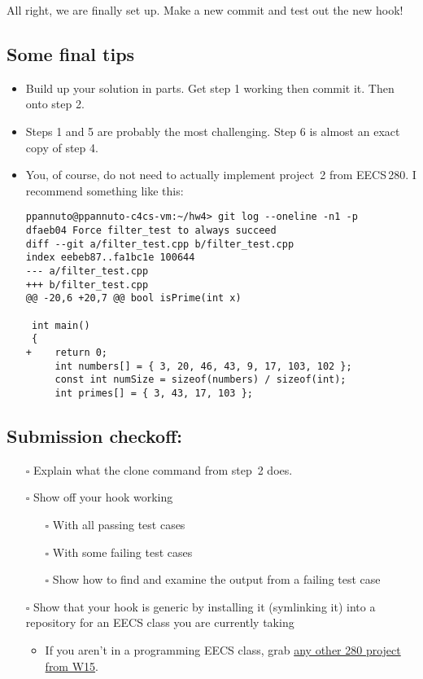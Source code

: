 \documentclass{article}
\begin{document}
\medskip
\noindent
All right, we are finally set up. Make a new commit and test out the new hook!

\newpage

\subsection*{Some final tips}

\begin{itemize}
  \item Build up your solution in parts. Get step 1 working then commit it.
    Then onto step 2.
  \item Steps 1 and 5 are probably the most challenging. Step 6 is almost an
    exact copy of step 4.
  \item You, of course, do not need to actually implement project~2 from
    EECS\,280.  I recommend something like this:%
\lstset{basicstyle=\footnotesize\ttfamily}
\begin{lstlisting}
ppannuto@ppannuto-c4cs-vm:~/hw4> git log --oneline -n1 -p
dfaeb04 Force filter_test to always succeed
diff --git a/filter_test.cpp b/filter_test.cpp
index eebeb87..fa1bc1e 100644
--- a/filter_test.cpp
+++ b/filter_test.cpp
@@ -20,6 +20,7 @@ bool isPrime(int x)
 
 int main()
 {
+    return 0;
     int numbers[] = { 3, 20, 46, 43, 9, 17, 103, 102 };
     const int numSize = sizeof(numbers) / sizeof(int);
     int primes[] = { 3, 43, 17, 103 };
\end{lstlisting}
\end{itemize}


\subsection*{Submission checkoff:}
\begin{itemize}
  \item[$\square$] Explain what the clone command from step~2 does.
  \item[$\square$] Show off your hook working
    \begin{itemize}
      \item[$\square$] With all passing test cases
      \item[$\square$] With some failing test cases
      \item[$\square$] Show how to find and examine the output from a failing
        test case
    \end{itemize}
  \item[$\square$] Show that your hook is generic by installing it (symlinking
    it) into a repository for an EECS class you are currently taking
    \begin{itemize}
      \item If you aren't in a programming EECS class, grab
        \href{http://www.andrewdeorio.com/teaching/eecs280/}{any other 280
        project from W15}.
    \end{itemize}
\end{itemize}
\end{document}
